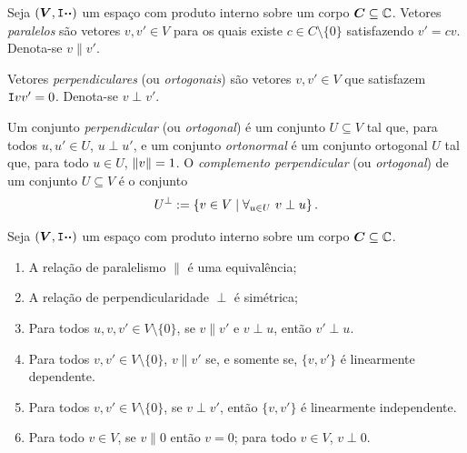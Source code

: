 \begin{defi}
Seja $(\bm V,\mathtt I{\bm{\cdot}}{\bm{\cdot}})$ um espaço com produto interno sobre um corpo $\bm C \subseteq \mathbb{C}$. Vetores \emph{paralelos} são vetores $v,v' \in V$ para os quais existe $c \in C \setminus \{0\}$ satisfazendo $v'=cv$. Denota-se $v \parallel v'$.

Vetores \emph{perpendiculares} (ou \emph{ortogonais}) são vetores $v,v' \in V$ que satisfazem $\mathtt I{v}{v'}=0$. Denota-se $v \perp v'$.

Um conjunto \emph{perpendicular} (ou \emph{ortogonal}) é um conjunto $U \subseteq V$ tal que, para todos $u,u' \in U$, $u \perp u'$, e um conjunto \emph{ortonormal} é um conjunto ortogonal $U$ tal que, para todo $u \in U$, $\left\Vert{v}\right\Vert=1$. O \emph{complemento perpendicular} (ou \emph{ortogonal}) de um conjunto $U \subseteq V$ é o conjunto
	\begin{equation*}
	U^\perp := \left\{v \in V \;\middle\vert\; \forall_{u \in U}\ v \perp u \right\}.
	\end{equation*}
\end{defi}

\begin{prop}
Seja $(\bm V,\mathtt I{\bm{\cdot}}{\bm{\cdot}})$ um espaço com produto interno sobre um corpo $\bm C \subseteq \mathbb{C}$.
	\begin{enumerate}
	\item A relação de paralelismo $\parallel$ é uma equivalência;
	\item A relação de perpendicularidade $\perp$ é simétrica;
	\item Para todos $u,v,v' \in V \setminus \{0\}$, se $v \parallel v'$ e $v \perp u$, então $v' \perp u$.
	\item Para todos $v,v' \in V \setminus \{0\}$, $v \parallel v'$ se, e somente se, $\{v,v'\}$ é linearmente dependente.
	\item Para todos $v,v' \in V \setminus \{0\}$, se $v \perp v'$, então $\{v,v'\}$ é linearmente independente.
	\item Para todo $v \in V$, se $v \parallel 0$ então $v=0$; para todo $v \in V$, $v \perp 0$.
	\end{enumerate}
\end{prop}

